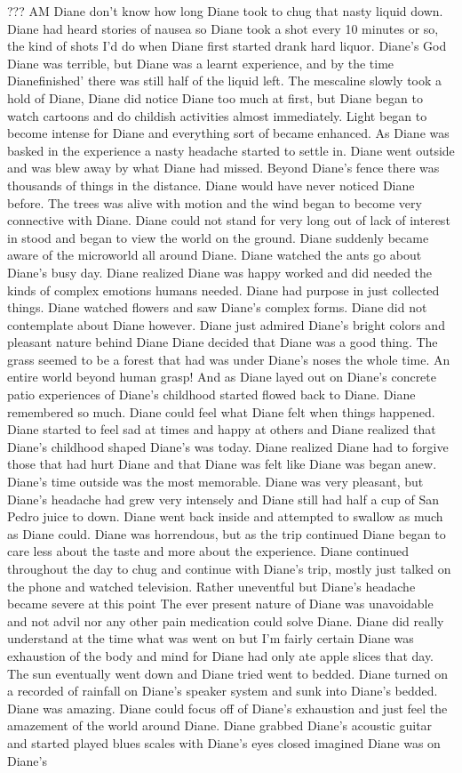 \documentclass[12pt]{book}
\begin{document}
??? AM Diane don't know how long Diane took to chug that nasty liquid down. Diane had heard stories of nausea so Diane took a shot every 10 minutes or so, the kind of shots I'd do when Diane first started drank hard liquor. Diane's God Diane was terrible, but Diane was a learnt experience, and by the time Dianefinished' there was still half of the liquid left. The mescaline slowly took a hold of Diane, Diane did notice Diane too much at first, but Diane began to watch cartoons and do childish activities almost immediately. Light began to become intense for Diane and everything sort of became enhanced. As Diane was basked in the experience a nasty headache started to settle in. Diane went outside and was blew away by what Diane had missed. Beyond Diane's fence there was thousands of things in the distance. Diane would have never noticed Diane before. The trees was alive with motion and the wind began to become very connective with Diane. Diane could not stand for very long out of lack of interest in stood and began to view the world on the ground. Diane suddenly became aware of the microworld all around Diane. Diane watched the ants go about Diane's busy day. Diane realized Diane was happy worked and did needed the kinds of complex emotions humans needed. Diane had purpose in just collected things. Diane watched flowers and saw Diane's complex forms. Diane did not contemplate about Diane however. Diane just admired Diane's bright colors and pleasant nature behind Diane Diane decided that Diane was a good thing. The grass seemed to be a forest that had was under Diane's noses the whole time. An entire world beyond human grasp! And as Diane layed out on Diane's concrete patio experiences of Diane's childhood started flowed back to Diane. Diane remembered so much. Diane could feel what Diane felt when things happened. Diane started to feel sad at times and happy at others and Diane realized that Diane's childhood shaped Diane's was today. Diane realized Diane had to forgive those that had hurt Diane and that Diane was felt like Diane was began anew. Diane's time outside was the most memorable. Diane was very pleasant, but Diane's headache had grew very intensely and Diane still had half a cup of San Pedro juice to down. Diane went back inside and attempted to swallow as much as Diane could. Diane was horrendous, but as the trip continued Diane began to care less about the taste and more about the experience. Diane continued throughout the day to chug and continue with Diane's trip, mostly just talked on the phone and watched television. Rather uneventful but Diane's headache became severe at this point The ever present nature of Diane was unavoidable and not advil nor any other pain medication could solve Diane. Diane did really understand at the time what was went on but I'm fairly certain Diane was exhaustion of the body and mind for Diane had only ate apple slices that day. The sun eventually went down and Diane tried went to bedded. Diane turned on a recorded of rainfall on Diane's speaker system and sunk into Diane's bedded. Diane was amazing. Diane could focus off of Diane's exhaustion and just feel the amazement of the world around Diane. Diane grabbed Diane's acoustic guitar and started played blues scales with Diane's eyes closed imagined Diane was on Diane's 
\end{document}
